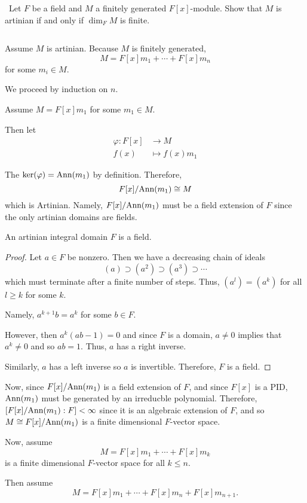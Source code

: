 \documentclass[12pt]{AlgebraQual}
\begin{document}
\begin{problem} $\,$
Let $F$ be a field and $M$ a finitely generated $F[x]$-module. Show that $M$ is artinian if and only if $\dim_FM$ is finite.
\end{problem}


\begin{solution}$\,$

\boxed{\implies} Assume $M$ is artinian. Because $M$ is finitely generated, $$M=F[x]m_1+\cdots+F[x]m_n$$ for some $m_i\in M.$

We proceed by induction on $n.$

Assume $M=F[x]m_1$ for some $m_1\in M$.

Then let \begin{align*}
    \varphi:F[x]&\to M\\
    f(x)&\mapsto f(x)m_1
\end{align*}

The $\ker(\varphi)=\text{Ann}(m_1)$ by definition. Therefore, $$F[x]/\text{Ann}(m_1)\cong M$$ which is Artinian. Namely, $F[x]/\text{Ann}(m_1)$ must be a field extension of $F$ since the only artinian domains are fields.

\begin{claim} An artinian integral domain $F$ is a field.
\begin{proof} Let $a\in F$ be nonzero. Then we have a decreasing chain of ideals $$(a)\supset (a^2)\supset (a^3)\supset\cdots$$ which must terminate after a finite number of steps. Thus, $(a^l)=(a^k)$ for all $l\ge k$ for some $k.$

Namely, $a^{k+1}b=a^k$ for some $b\in F$.

However, then $a^k(ab-1)=0$ and since $F$ is a domain, $a\not=0$ implies that $a^k\not=0$ and so $ab=1$. Thus, $a$ has a right inverse.

Similarly, $a$ has a left inverse so $a$ is invertible. Therefore, $F$ is a field.
\end{proof}
\end{claim}

Now, since $F[x]/\text{Ann}(m_1)$ is a field extension of $F$, and since $F[x]$ is a PID, $\text{Ann}(m_1)$ must be generated by an irreducble polynomial. Therefore, $[F[x]/\text{Ann}(m_1):F]<\infty$ since it is an algebraic extension of $F$, and so $M\cong F[x]/\text{Ann}(m_1)$ is a finite dimensional $F$-vector space.

Now, assume $$M=F[x]m_1+\cdots+F[x]m_k$$ is a finite dimensional $F$-vector space for all $k\le n$.

Then assume $$M=F[x]m_1+\cdots+F[x]m_n+F[x]m_{n+1}.$$


\end{solution}
\end{document}
